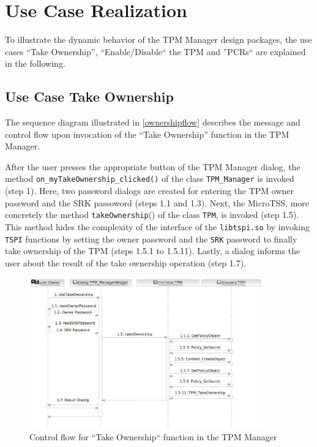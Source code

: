 \documentclass[
  american        %
]{sirrixreport}
\begin{document}
\section{Use Case Realization} 
\label{sec:usecase}
To illustrate the dynamic behavior of the TPM Manager design packages, the use cases ``Take Ownership'', ``Enable/Disable`` the TPM and ''PCRs`` are
explained in the following.

\subsection{Use Case Take Ownership}
\label{sec:takeowner}
The sequence diagram illustrated in \autoref{ownershipflow} describes the message and
control flow upon invocation of the ``Take Ownership'' function in the TPM Manager.

After the user presses the appropriate button of the TPM Manager dialog, the method \lstinline'on_myTakeOwnership_clicked()'
of the class \lstinline'TPM_Manager' is invoked (step 1). Here, two password dialogs are created for entering
the TPM owner password and the SRK passoword (steps 1.1 and 1.3). Next, the MicroTSS,
more concretely the method \lstinline'takeOwnership'() of the class \lstinline'TPM', is invoked (step 1.5). This method
hides the complexity of the interface of the \lstinline'libtspi.so' by invoking \lstinline'TSPI' functions by setting the owner password and the \lstinline'SRK' password to finally take ownership of the TPM (steps 1.5.1 to 1.5.11). Lastly, a dialog informs the user about the result 
of the take ownership operation (step 1.7).

\begin{figure}[h]
 \centering
 \includegraphics[width=0.9\textwidth]{images/arch_takeownerflow.jpg}
 \caption{Control flow for ``Take Ownership`` function in the TPM Manager}
 \label{ownershipflow}
\end{figure}
\clearpage
\end{document}
